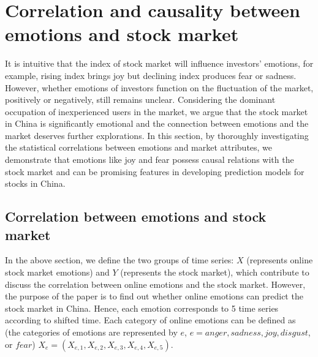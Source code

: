 \documentclass[aps,preprint,groupedaddress]{revtex4-1}
\begin{document}
\section{Correlation and causality between emotions and stock market}
\label{sec:cor_cau}

It is intuitive that the index of stock market will influence investors' emotions, for example, rising index brings joy but declining index produces fear or sadness. However, whether emotions of investors function on the fluctuation of the market, positively or negatively, still remains unclear. Considering the dominant occupation of inexperienced users in the market, we argue that the stock market in China is significantly emotional and the connection between emotions and the market deserves further explorations. In this section, by thoroughly investigating the statistical correlations between emotions and market attributes, we demonstrate that emotions like joy and fear possess causal relations with the stock market and can be promising features in developing prediction models for stocks in China. {\color{black}{It is worth noting that considering the tiny fraction of experienced or institutional investors (less emotional) in the market, we do not discuss the correlation or causality for different investors in the following parts of the study.}}

\subsection{Correlation between emotions and stock market}
\label{sec:correlation}

In the above section, we define the two groups of time series: $X$ (represents online stock market emotions) and $Y$ (represents the stock market), which contribute to discuss the correlation between online emotions and the stock market. However, the purpose of the paper is to find out whether online emotions can predict the stock market in China. {} Hence, each emotion corresponds to 5 time series according to shifted time. Each category of online emotions can be defined as (the categories of emotions are represented by $e$, $e=anger, sadness, joy, disgust$, or $fear$) $X_{e} = (X_{e, 1}, X_{e, 2}, X_{e, 3}, X_{e, 4}, X_{e, 5}).$
\end{document}

